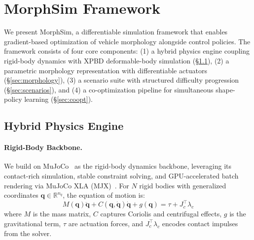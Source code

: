 
\section{MorphSim Framework}
\label{sec:method}

We present MorphSim, a differentiable simulation framework that enables gradient-based optimization of vehicle morphology alongside control policies. The framework consists of four core components: (1) a hybrid physics engine coupling rigid-body dynamics with XPBD deformable-body simulation (\S\ref{sec:engine}), (2) a parametric morphology representation with differentiable actuators (\S\ref{sec:morphology}), (3) a scenario suite with structured difficulty progression (\S\ref{sec:scenarios}), and (4) a co-optimization pipeline for simultaneous shape-policy learning (\S\ref{sec:coopt}).

\subsection{Hybrid Physics Engine}
\label{sec:engine}

\paragraph{Rigid-Body Backbone.}
We build on MuJoCo~\citep{todorov2012mujoco} as the rigid-body dynamics backbone, leveraging its contact-rich simulation, stable constraint solving, and GPU-accelerated batch rendering via MuJoCo XLA (MJX)~\citep{deepmind2024mjx}. For $N$ rigid bodies with generalized coordinates $\mathbf{q} \in \mathbb{R}^{n_q}$, the equation of motion is:
\begin{equation}
    M(\mathbf{q})\ddot{\mathbf{q}} + C(\mathbf{q}, \dot{\mathbf{q}})\dot{\mathbf{q}} + g(\mathbf{q}) = \tau + J_c^\top \lambda_c
    \label{eq:eom}
\end{equation}
where $M$ is the mass matrix, $C$ captures Coriolis and centrifugal effects, $g$ is the gravitational term, $\tau$ are actuation forces, and $J_c^\top \lambda_c$ encodes contact impulses from the solver.

